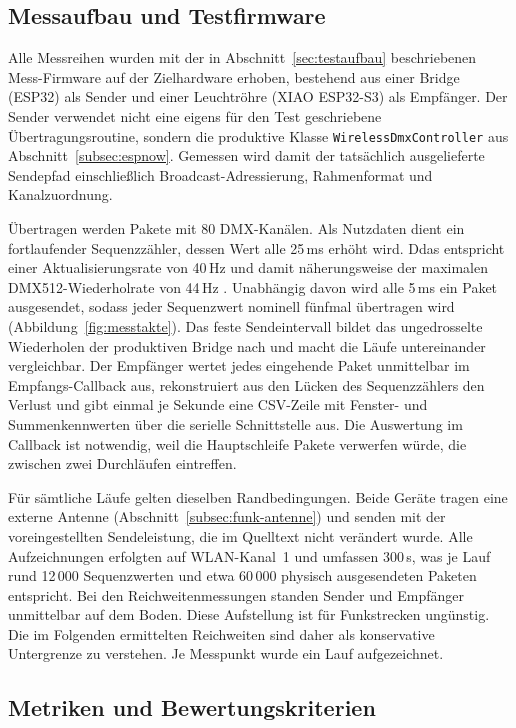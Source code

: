\subsection{Messaufbau und Testfirmware}
\label{subsec:messaufbau}

Alle Messreihen wurden mit der in Abschnitt~\ref{sec:testaufbau} beschriebenen
Mess-Firmware auf der Zielhardware erhoben, bestehend aus einer Bridge (ESP32)
als Sender und einer Leuchtröhre (XIAO ESP32-S3) als Empfänger. Der Sender
verwendet nicht eine eigens für den Test geschriebene Übertragungsroutine,
sondern die produktive Klasse \texttt{WirelessDmxController} aus
Abschnitt~\ref{subsec:espnow}. Gemessen wird damit der tatsächlich ausgelieferte
Sendepfad einschließlich Broadcast-Adressierung, Rahmenformat und Kanalzuordnung.

Übertragen werden Pakete mit 80 DMX-Kanälen. Als Nutzdaten dient ein
fortlaufender Sequenzzähler, dessen Wert alle 25\,ms erhöht wird. Ddas entspricht
einer Aktualisierungsrate von 40\,Hz und damit näherungsweise der maximalen
DMX512-Wiederholrate von 44\,Hz \cite{ANSI_E1.11_2024,yang2015real}. Unabhängig
davon wird alle 5\,ms ein Paket ausgesendet, sodass jeder Sequenzwert nominell
fünfmal übertragen wird (Abbildung~\ref{fig:messtakte}). Das feste Sendeintervall
bildet das ungedrosselte Wiederholen der produktiven Bridge nach und macht die
Läufe untereinander vergleichbar. Der Empfänger wertet jedes eingehende Paket
unmittelbar im Empfangs-Callback aus, rekonstruiert aus den Lücken des
Sequenzzählers den Verlust und gibt einmal je Sekunde eine CSV-Zeile mit
Fenster- und Summenkennwerten über die serielle Schnittstelle aus. Die Auswertung
im Callback ist notwendig, weil die Hauptschleife Pakete verwerfen würde, die
zwischen zwei Durchläufen eintreffen.

Für sämtliche Läufe gelten dieselben Randbedingungen. Beide Geräte tragen eine
externe Antenne (Abschnitt~\ref{subsec:funk-antenne}) und senden mit der
voreingestellten Sendeleistung, die im Quelltext nicht verändert wurde.
Alle Aufzeichnungen erfolgten auf WLAN-Kanal~1 und umfassen 300\,s,
was je Lauf rund 12\,000 Sequenzwerten und etwa 60\,000 physisch ausgesendeten
Paketen entspricht. Bei den Reichweitenmessungen standen Sender und Empfänger
unmittelbar auf dem Boden. Diese Aufstellung ist für Funkstrecken ungünstig.
Die im Folgenden ermittelten Reichweiten sind daher als konservative Untergrenze zu verstehen. 
Je Messpunkt wurde ein Lauf aufgezeichnet.

\subsection{Metriken und Bewertungskriterien}
\label{subsec:metriken}

